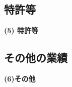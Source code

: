 \subsection{特許等}
	\noindent
	{\bf (5) 特許等}
{%
}%

\subsection{その他の業績}
	\noindent
	{\bf (6)その他}
{%
}%

\KLCheckPageLimit
\KLAdvancePages



